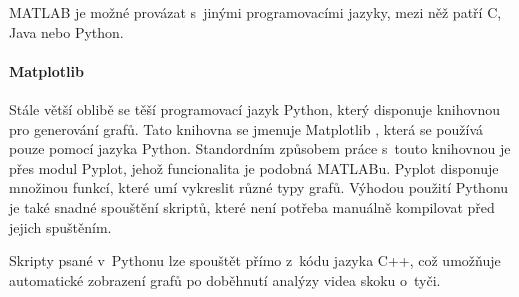 MATLAB je možné provázat s~jinými programovacími jazyky, mezi něž patří C, Java nebo Python.

\paragraph{Matplotlib}

Stále větší oblibě se těší programovací jazyk Python, který disponuje knihovnou pro generování grafů. Tato knihovna se jmenuje Matplotlib \citep{Matplotlib}, která se používá pouze pomocí jazyka Python. Standordním způsobem práce s~touto knihovnou je přes modul Pyplot, jehož funcionalita je podobná MATLABu. Pyplot disponuje množinou funkcí, které umí vykreslit různé typy grafů. Výhodou použití Pythonu je také snadné spouštění skriptů, které není potřeba manuálně kompilovat před jejich spuštěním.

Skripty psané v~Pythonu lze spouštět přímo z~kódu jazyka C++, což umožňuje automatické zobrazení grafů po doběhnutí analýzy videa skoku o~tyči.

































